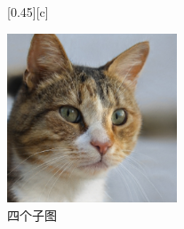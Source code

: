 \documentclass[12pt,a4paper,UTF8]{article}
\begin{document}
\begin{figure}[!htbp]
{        }%
        \hspace*{0.1cm}
        [0.45\textwidth][c]{
            \centering
            \includegraphics[width=0.45\textwidth]{example}
             
        }%
        \caption{四个子图}
         
    \end{figure}
\end{document}
